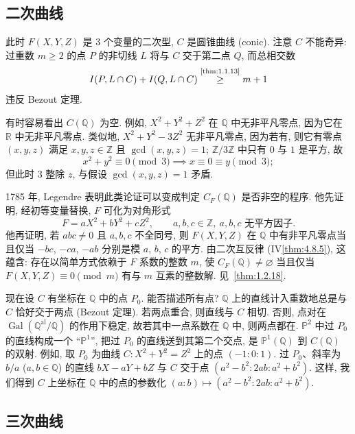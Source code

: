 \subsection*{二次曲线}

此时 $F(X,Y,Z)$ 是 3 个变量的二次型, $C$ 是圆锥曲线 (conic). 注意 $C$ 不能奇异: 过重数 $m\ge 2$ 的点 $P$ 的非切线 $L$ 将与 $C$ 交于第二点 $Q$, 而总相交数
\[
I(P, L\cap C) + I(Q, L\cap C) \overset{\text{\ref{thm:1.1.13}}}{\ge} m + 1
\]
违反 Bezout 定理.

有时容易看出 $C(\mathbb{Q})$ 为空. 例如, $X^2 + Y^2 + Z^2$ 在 $\mathbb{Q}$ 中无非平凡零点, 因为它在 $\mathbb{R}$ 中无非平凡零点. 类似地, $X^2 + Y^2 - 3Z^2$ 无非平凡零点, 因为若有, 则它有零点 $(x,y,z)$ 满足 $x,y,z\in\mathbb{Z}$ 且 $\gcd(x,y,z) = 1$; $\mathbb{Z}/3\mathbb{Z}$ 中只有 $0$ 与 $1$ 是平方, 故
\[
x^2 + y^2 \equiv 0 \pmod{3} \implies x\equiv 0\equiv y \pmod{3};
\]
但此时 $3$ 整除 $z$, 与假设 $\gcd(x,y,z) = 1$ 矛盾.

1785 年, Legendre 表明此类论证可以变成判定 $C_F(\mathbb{Q})$ 是否非空的程序. 他先证明, 经初等变量替换, $F$ 可化为对角形式
\[
F = aX^2 + bY^2 + cZ^2, \qquad a,b,c\in\mathbb{Z}, \ a,b,c \text{ 无平方因子}.
\]
他再证明, 若 $abc\neq 0$ 且 $a,b,c$ 不全同号, 则 $F(X,Y,Z)$ 在 $\mathbb{Q}$ 中有非平凡零点当且仅当 $-bc$, $-ca$, $-ab$ 分别是模 $a$, $b$, $c$ 的平方. 由二次互反律 (IV\ref{thm:4.8.5}), 这蕴含: 存在以简单方式依赖于 $F$ 系数的整数 $m$, 使 $C_F(\mathbb{Q})\neq\varnothing$ 当且仅当 $F(X,Y,Z)\equiv 0\pmod{m}$ 有与 $m$ 互素的整数解. 见~\ref{thm:1.2.18}.

现在设 $C$ 有坐标在 $\mathbb{Q}$ 中的点 $P_0$. 能否描述所有点? $\mathbb{Q}$ 上的直线计入重数地总是与 $C$ 恰好交于两点 (Bezout 定理). 若两点重合, 则直线与 $C$ 相切. 否则, 点对在 $\operatorname{Gal}(\mathbb{Q}^{\mathrm{al}}/\mathbb{Q})$ 的作用下稳定, 故若其中一点系数在 $\mathbb{Q}$ 中, 则两点都在. $\mathbb{P}^2$ 中过 $P_0$ 的直线构成一个 ``$\mathbb{P}^1$'', 把过 $P_0$ 的直线送到其第二个交点, 是 $\mathbb{P}^1(\mathbb{Q})$ 到 $C(\mathbb{Q})$ 的双射. 例如, 取 $P_0$ 为曲线 $C\colon X^2 + Y^2 = Z^2$ 上的点 $(-1:0:1)$. 过 $P_0$、斜率为 $b/a$ ($a,b\in\mathbb{Q}$) 的直线 $bX - aY + bZ$ 与 $C$ 交于点 $(a^2-b^2 : 2ab : a^2+b^2)$. 这样, 我们得到 $C$ 上坐标在 $\mathbb{Q}$ 中的点的参数化 $(a:b)\mapsto(a^2-b^2:2ab:a^2+b^2)$.

\subsection*{三次曲线}

